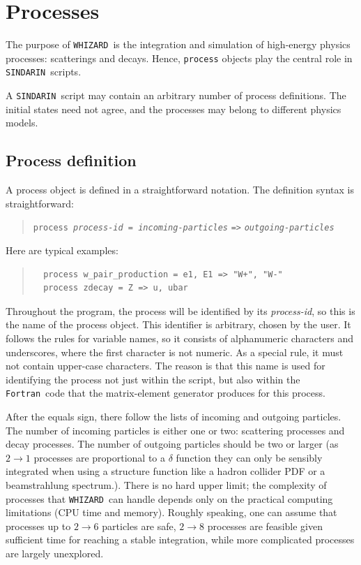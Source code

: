 \documentclass[12pt]{book}
\newcommand{\ttt}[1]{\texttt{#1}}
\newcommand{\whizard}{\ttt{WHIZARD}}
\newcommand{\sindarin}{\ttt{SINDARIN}}
\newcommand{\fortran}{\ttt{Fortran}}
\begin{document}
\section{Processes}
\label{sec:processes}

The purpose of \whizard\ is the integration and simulation of high-energy
physics processes: scatterings and decays.  Hence, \ttt{process} objects play
the central role in \sindarin\ scripts.

A \sindarin\ script may contain an arbitrary number of process definitions.  The
initial states need not agree, and the processes may belong to different
physics models.


\subsection{Process definition}
\label{sec:procdef}

A process object is defined in a straightforward notation.  The definition
syntax is straightforward:
\begin{quote}
\begin{footnotesize}
  \ttt{process \textit{process-id} = \textit{incoming-particles}} \verb|=>|
  \ttt{\textit{outgoing-particles}}
\end{footnotesize}
\end{quote}
Here are typical examples:
\begin{quote}
\begin{footnotesize}
\begin{verbatim}
  process w_pair_production = e1, E1 => "W+", "W-"
  process zdecay = Z => u, ubar
\end{verbatim}
\end{footnotesize}
\end{quote}
Throughout the program, the process will be identified by its
\textit{process-id}, so this is the name of the process object.  This
identifier is arbitrary, chosen by the user.  It follows the rules for
variable names, so it consists of alphanumeric characters and underscores,
where the first character is not numeric.  As a special rule, it must not
contain upper-case characters.  The reason is that this name is used for
identifying the process not just within the script, but also within the
\fortran\ code that the matrix-element generator produces for this process.

After the equals sign, there follow the lists of incoming and outgoing
particles.  The number of incoming particles is either one or two: scattering
processes and decay processes.  The number of outgoing particles should be two
or larger (as $2\to 1$ processes are proportional to a $\delta$
function they can only be sensibly integrated when using a structure
function like a hadron collider PDF or a beamstrahlung spectrum.).
There is no hard upper limit; the complexity of processes that
\whizard\ can handle depends only on the practical computing
limitations (CPU time and memory).  Roughly speaking, one can assume
that processes up to $2\to 6$ particles are safe, $2\to 8$ processes
are feasible given sufficient time for reaching a stable integration,
while more complicated processes are largely unexplored.
\end{document}
